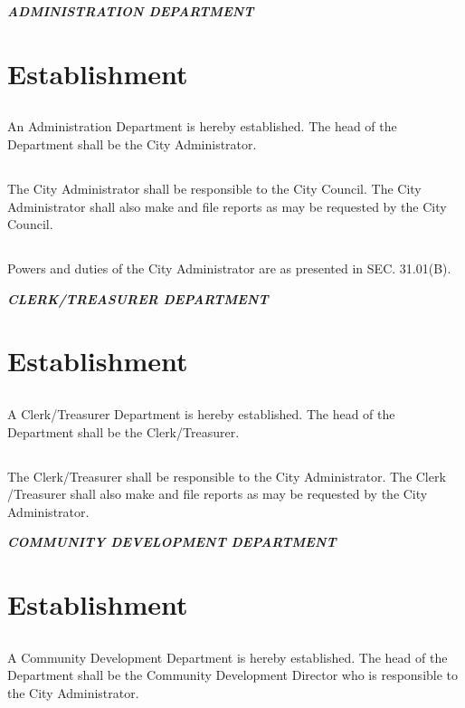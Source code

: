 \centerline{\textbf{\emph{\LARGE{ADMINISTRATION DEPARTMENT}}}}
\setcounter{section}{9}
\section{Establishment}
\subsection{}
An Administration Department is hereby established. The head of the Department shall be the City Administrator.
\subsection{}
The City Administrator shall be responsible to the City Council. The City Administrator shall also make and file reports as may be requested by the City Council.
\subsection{}
Powers and duties of the City Administrator are as presented in SEC. 31.01(B).\newline

\centerline{\textbf{\emph{\LARGE{CLERK/TREASURER DEPARTMENT}}}}
\setcounter{section}{19}
\section{Establishment}
\subsection{}
A Clerk/Treasurer Department is hereby established. The head of the Department shall be the Clerk/Treasurer.
\subsection{}
The Clerk/Treasurer shall be responsible to the City Administrator. The Clerk /Treasurer shall also make and file reports as may be requested by the City Administrator.\newline

\centerline{\textbf{\emph{\LARGE{COMMUNITY DEVELOPMENT DEPARTMENT}}}}
\setcounter{section}{29}
\section{Establishment}
\subsection{}
A Community Development Department is hereby established.  The head of the Department shall be the Community Development Director who is responsible to the City Administrator.
